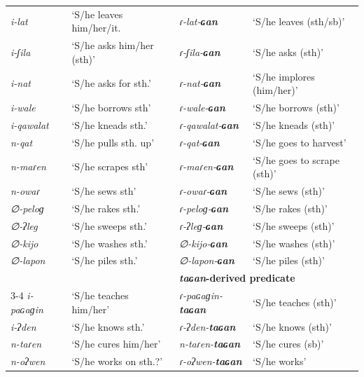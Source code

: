 \documentclass[12pt]{article}
\begin{document}
\begin{center}
\begin{tabularx}{\textwidth}{XXXX}
\textit{i-lat} & `S/he leaves him/her/it. & \textit{ɾ-lat-\textbf{ɢan}} & `S/he leaves (sth/sb)' \\ 
\textit{i-ʃila} & `S/he asks him/her (sth)' & \textit{ɾ-ʃila-\textbf{ɢan}} & `S/he asks (sth)' \\
\textit{i-nat} & `S/he asks for sth.' & \textit{ɾ-nat-\textbf{ɢan}} & `S/he implores (him/her)' \\ 
\textit{i-wale} & `S/he borrows sth' & \textit{ɾ-wale-\textbf{ɢan}} & `S/he borrows (sth)' \\
\textit{i-qawalat} & `S/he  kneads sth.' & \textit{ɾ-qawalat-\textbf{ɢan}} & `S/he kneads (sth)' \\ 
\textit{n-qat} & `S/he  pulls sth. up' & \textit{ɾ-qat-\textbf{ɢan}} & `S/he goes to harvest' \\ 
\textit{n-maɾen} & `S/he  scrapes sth' & \textit{ɾ-maɾen-\textbf{ɢan}} & `S/he goes to scrape (sth)' \\ 
\textit{n-owaɾ} & `S/he sews sth' & \textit{ɾ-owaɾ-\textbf{ɢan}} & `S/he sews (sth)' \\ 
\textit{∅-peloɡ} & `S/he rakes sth.' & \textit{ɾ-peloɡ-\textbf{ɢan}} & `S/he rakes (sth)' \\ 
\textit{∅-ʔleg} & `S/he sweeps sth.' & \textit{ɾ-ʔleɡ-\textbf{ɢan}} & `S/he sweeps (sth)' \\ 
\textit{∅-kijo} & `S/he washes sth.' & \textit{∅-kijo-\textbf{ɢan}} & `S/he washes (sth)' \\ 
\textit{∅-lapon} & `S/he piles sth.' & \textit{∅-lapon-\textbf{ɢan}} & `S/he piles (sth)' \\ 

 \multicolumn{2}{l}{} & \multicolumn{2}{l}{ \textbf{\textit{taɢan}-derived predicate}} \\\cmidrule{3-4}
 \textit{i-paɢaɡin} & `S/he teaches him/her' & \textit{ɾ-paɢaɡin-\textbf{taɢan}} & `S/he teaches (sth)' \\
\textit{i-ʔden} & `S/he knows sth.' & \textit{ɾ-ʔden-\textbf{taɢan}} & `S/he knows (sth)'\\
\textit{n-taɾen} & `S/he cures him/her' & \textit{n-taɾen-\textbf{taɢan}} & `S/he cures (sb)'\\
\textit{n-oʔwen} & `S/he works on sth.?' & \textit{ɾ-oʔwen-\textbf{taɢan}} & `S/he works'\\
\end{tabularx}
\end{center}
\end{document}
